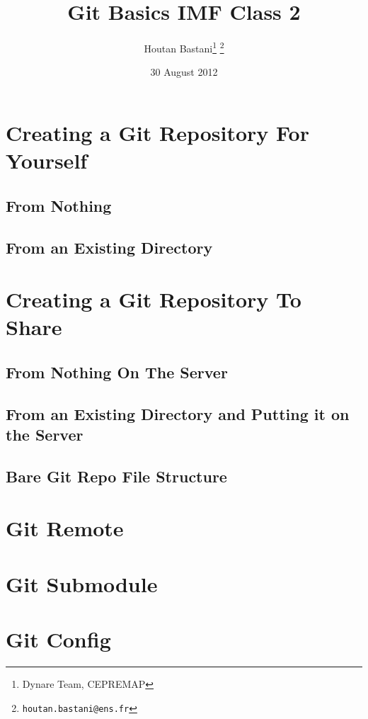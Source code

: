 \documentclass[10pt,letterpaper]{article}
\begin{document}
\title{Git Basics IMF Class 2}
\author{Houtan Bastani\thanks{Dynare Team, CEPREMAP} \thanks{\texttt{houtan.bastani@ens.fr}}}
\date{30 August 2012}
\maketitle

\section{Creating a Git Repository For Yourself}

\subsection{From Nothing}

\subsection{From an Existing Directory}

\section{Creating a Git Repository To Share}

\subsection{From Nothing On The Server}

\subsection{From an Existing Directory and Putting it on the Server}

\subsection{Bare Git Repo File Structure}

\section{Git Remote}

\section{Git Submodule}

\section{Git Config}
\end{document}
